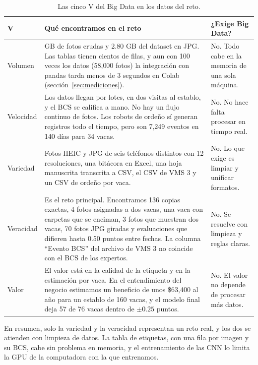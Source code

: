\documentclass[11pt,letterpaper,DIV=12]{scrartcl}
\begin{document}
\begin{table}[H]
  \centering
  \small
  \caption{Las cinco V del Big Data en los datos del reto.}
  \label{tab:cinco-v}
  \begin{tabularx}{\textwidth}{>{\raggedright\arraybackslash}p{}>{\raggedright\arraybackslash}X>{\raggedright\arraybackslash}p{}}
    \toprule
    V & Qué encontramos en el reto & ¿Exige Big Data? \\
    \midrule
    Volumen & 2.18 GB de fotos crudas y 2.80 GB del dataset en JPG. Las tablas tienen cientos de filas, y aun con 100 veces los datos (58{,}000 fotos) la integración con pandas tarda menos de 3 segundos en Colab (sección~\ref{sec:mediciones}). & No. Todo cabe en la memoria de una sola máquina. \\
    \addlinespace
    Velocidad & Los datos llegan por lotes, en dos visitas al establo, y el BCS se califica a mano. No hay un flujo continuo de fotos. Los robots de ordeño sí generan registros todo el tiempo, pero son 7{,}249 eventos en 140 días para 34 vacas. & No. No hace falta procesar en tiempo real. \\
    \addlinespace
    Variedad & Fotos HEIC y JPG de seis teléfonos distintos con 12 resoluciones, una bitácora en Excel, una hoja manuscrita transcrita a CSV, el CSV de VMS 3 y un CSV de ordeño por vaca. & No. Lo que exige es limpiar y unificar formatos. \\
    \addlinespace
    Veracidad & Es el reto principal. Encontramos 136 copias exactas, 4 fotos asignadas a dos vacas, una vaca con carpetas que se enciman, 3 fotos que muestran dos vacas, 70 fotos JPG giradas y evaluaciones que difieren hasta 0.50 puntos entre fechas. La columna ``Evento BCS'' del archivo de VMS 3 no coincide con el BCS de los expertos. & No. Se resuelve con limpieza y reglas claras. \\
    \addlinespace
    Valor & El valor está en la calidad de la etiqueta y en la estimación por vaca. En el entendimiento del negocio estimamos un beneficio de unos \$63{,}400 al año para un establo de 160 vacas, y el modelo final deja 57 de 76 vacas dentro de $\pm0.25$ puntos. & No. El valor no depende de procesar más datos. \\
    \bottomrule
  \end{tabularx}
\end{table}

En resumen, solo la variedad y la veracidad representan un reto real, y los dos se atienden con limpieza de datos. La tabla de etiquetas, con una fila por imagen y su BCS, cabe sin problema en memoria, y el entrenamiento de las CNN lo limita la GPU de la computadora con la que entrenamos.
\end{document}
